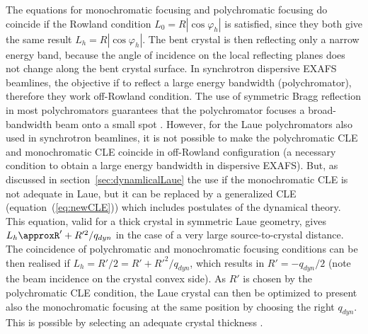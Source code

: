 \documentclass[preprint]{iucr}              %
\newcommand{\inblue}[1]{{\color{blue}#1}}
\begin{document}
The equations for monochromatic focusing and polychromatic focusing do coincide if the Rowland condition $L_0=R|\cos\varphi_h|$ is satisfied, since they both give the same result $L_h=R|\cos\varphi_h|$. The bent crystal is then reflecting only a narrow energy band, because the angle of incidence on the local reflecting planes does not change along the bent crystal surface.
\inblue{In synchrotron dispersive EXAFS beamlines, the objective if to reflect a large energy bandwidth (polychromator), therefore they work off-Rowland condition. The use of symmetric Bragg reflection in most polychromators guarantees that the polychromator focuses a broad-bandwidth beam onto a small spot \cite{Tolentino:ms0206}. However, for the Laue polychromators also used in synchrotron beamlines, it is not possible to make the polychromatic CLE and monochromatic CLE coincide in off-Rowland configuration (a necessary condition to obtain a large energy bandwidth in dispersive EXAFS). But, as discussed in section~\ref{sec:dynamlicalLaue} the use if the monochromatic CLE is not adequate in Laue, but it can be replaced by a generalized CLE (equation~(\ref{eq:newCLE})) which includes postulates of the dynamical theory.  
This equation, valid for a thick crystal in symmetric Laue geometry, gives $L_h\approxR'+R'^2/q_{dyn}$ in the case of a very large source-to-crystal distance. The coincidence of polychromatic and monochromatic focusing conditions can be then realised if $L_h=R'/2=R'+R'^2/q_{dyn}$, which results in $R'=-q_{dyn}/2$ (note the beam incidence on the crystal convex side). As $R'$ is chosen by the polychromatic CLE condition, the Laue crystal can then be optimized to present also the monochromatic focusing at the same position by choosing the right $q_{dyn}$. This is possible by selecting an adequate crystal thickness \cite{Mocella2004} \cite{Mocella2008}. 
}
\end{document}
